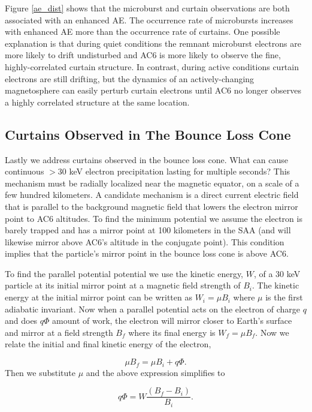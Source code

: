 \documentclass[draft]{agujournal2019}
\begin{document}
Figure \ref{ae_dist} shows that the microburst and curtain observations are both associated with an enhanced AE. The occurrence rate of microbursts increases with enhanced AE more than the occurrence rate of curtains. One possible explanation is that during quiet conditions the remnant microburst electrons are more likely to drift undisturbed and AC6 is more likely to observe the fine, highly-correlated curtain structure. In contrast, during active conditions curtain electrons are still drifting, but the dynamics of an actively-changing magnetosphere can easily perturb curtain electrons until AC6 no longer observes a highly correlated structure at the same location.
 
\subsection{Curtains Observed in The Bounce Loss Cone}
Lastly we address curtains observed in the bounce loss cone. What can cause continuous $>30$ keV electron precipitation lasting for multiple seconds? This mechanism must be radially localized near the magnetic equator, on a scale of a few hundred kilometers. A candidate mechanism is a direct current electric field that is parallel to the background magnetic field that lowers the electron mirror point to AC6 altitudes. To find the minimum potential we assume the electron is barely trapped and has a mirror point at 100 kilometers in the SAA (and will likewise mirror above AC6's altitude in the conjugate point). This condition implies that the particle's mirror point in the bounce loss cone is above AC6. 

To find the parallel potential potential we use the kinetic energy, $W$, of a $30$ keV particle at its initial mirror point at a magnetic field strength of $B_i$. The kinetic energy at the initial mirror point can be written as $W_i = \mu B_i$ where $\mu$ is the first adiabatic invariant. Now when a parallel potential acts on the electron of charge $q$ and does $q \Phi$ amount of work, the electron will mirror closer to Earth's surface and mirror at a field strength $B_f$ where its final energy is $W_f = \mu B_f$. Now we relate the initial and final kinetic energy of the electron,

\begin{equation}
\mu B_f = \mu B_i + q \Phi.
\end{equation} Then we substitute $\mu$ and the above expression simplifies to

\begin{equation}
 q \Phi = W \frac{(B_f - B_i)}{B_i}.
\end{equation}
\end{document}
